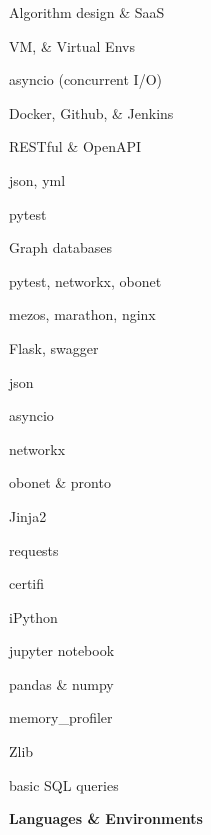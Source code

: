 \documentclass[letterpaper,final]{memoir}
\newcommand{\Sep}{\vspace{1.0em}}
\newcommand{\CVItem}[1]
	{\textbf{\color{Blue} #1}}
\begin{document}
\begin{multicols}{2}

    \begin{compactitem}[\color{Blue}$\circ$]
		
		\item Algorithm design \& SaaS
		
        \item VM, \& Virtual Envs
        
        \item asyncio (concurrent I/O)
		
        \item Docker, Github, \& Jenkins
        
        \item RESTful \& OpenAPI
        
        \item json, yml
        
        \item pytest
   
        \item Graph databases
        
        \item pytest, networkx, obonet
  
        \item mezos, marathon, nginx
        
        \item Flask, swagger
        \item json
        \item asyncio
        \item networkx
        \item obonet \& pronto
        \item Jinja2
        \item requests
        \item certifi
        \item iPython
        \item jupyter notebook
        \item pandas \& numpy
        \item memory\_profiler
        \item Zlib
        \item basic SQL queries
        \item 
      
    \end{compactitem}

\end{multicols}
\Sep
\CVItem{Languages \& Environments}
\Sep
\end{document}
